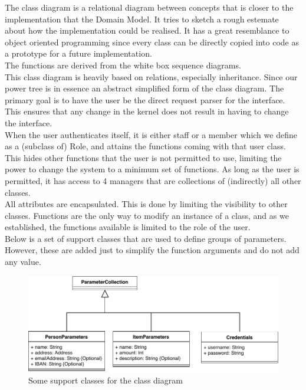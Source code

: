 The class diagram is a relational diagram between concepts that is closer to the implementation that the Domain Model. It tries to sketch a rough estemate about how the implementation could be realised. It has a great resemblance to object oriented programming since every class can be directly copied into code as a prototype for a future implementation.\\
The functions are derived from the white box sequence diagrams.\\
This class diagram is heavily based on relations, especially inheritance. Since our power tree is in essence an abstract simplified form of the class diagram. The primary goal is to have the user be the direct request parser for the interface. This ensures that any change in the kernel does not result in having to change the interface.\\
When the user authenticates itself, it is either staff or a member which we define as a (subclass of) Role, and attains the functions coming with that user class. This hides other functions that the user is not permitted to use, limiting the power to change the system to a minimum set of functions. As long as the user is permitted, it has access to 4 managers that are collections of (indirectly) all other classes.\\
All attributes are encapsulated. This is done by limiting the visibility to other classes. Functions are the only way to modify an instance of a class, and as we established, the functions available is limited to the role of the user.\\


Below is a set of support classes that are used to define groups of parameters. However, these are added just to simplify the function arguments and do not add any value.
\begin{figure}[H]
	\centering
	\includegraphics{uml/classdiagramsupport.pdf}
	\caption*{Some support classes for the class diagram}
\end{figure}
